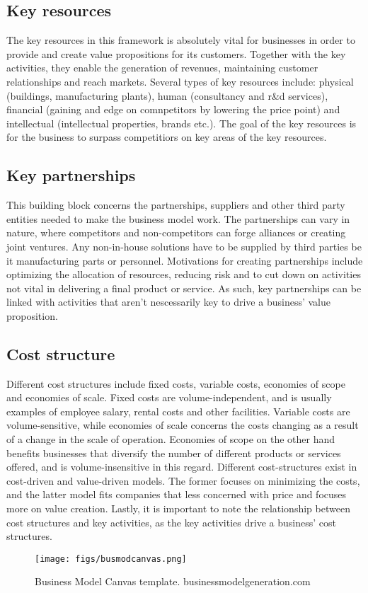 \subsection{Key resources}
The key resources in this framework is absolutely vital for businesses in order to provide and create value propositions for its customers. Together with the key activities, they enable the generation of revenues, maintaining customer relationships and reach markets. Several types of key resources include:  physical (buildings, manufacturing plants), human (consultancy and r\&d services), financial (gaining and edge on comnpetitors by lowering the price point) and intellectual (intellectual properties, brands etc.). The goal 
of the key resources is for the business to surpass competitiors on key areas of the key resources.

\subsection{Key partnerships}
This building block concerns the partnerships, suppliers and other third party entities needed to make the business model work. The partnerships can vary in nature, where competitors and non-competitors can forge alliances or creating joint ventures. Any non-in-house solutions have to be supplied by third parties be it manufacturing parts or personnel. Motivations for creating partnerships include optimizing the allocation of resources, reducing risk and to cut down on activities not vital in delivering a final product or service. As such, key partnerships can be linked with activities that aren't nescessarily key to drive a business' value proposition. 

\subsection{Cost structure}
Different cost structures include fixed costs, variable costs, economies of scope and economies of scale. Fixed costs are volume-independent, and is usually examples of employee salary, rental costs and other facilities. Variable costs are volume-sensitive, while economies of scale concerns the costs changing as a result of a change in the scale of operation. Economies of scope on the other hand benefits businesses that diversify the number of different products or services offered, and is volume-insensitive in this regard. Different cost-structures exist in cost-driven and value-driven models. The former focuses on minimizing the costs, and the latter model fits companies that less concerned with price and focuses more on value creation.
Lastly, it is important to note the relationship between cost structures and key activities, as the key activities drive a business' cost structures. 

\begin{figure}[]
\centering
\texttt{[image: figs/busmodcanvas.png]}
\caption{Business Model Canvas template. \textcopyright businessmodelgeneration.com}
\label{fig:businessmodelcanvas}
\end{figure}
